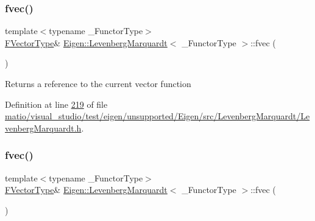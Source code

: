 \subsubsection{\texorpdfstring{fvec()}{fvec()}\hspace{0.1cm}{\footnotesize\ttfamily [1/2]}}
{\footnotesize\ttfamily template$<$typename \+\_\+\+Functor\+Type$>$ \\
\hyperlink{group___core___module}{F\+Vector\+Type}\& \hyperlink{class_eigen_1_1_levenberg_marquardt}{Eigen\+::\+Levenberg\+Marquardt}$<$ \+\_\+\+Functor\+Type $>$\+::fvec (\begin{DoxyParamCaption}{ }\end{DoxyParamCaption})\hspace{0.3cm}{\ttfamily [inline]}}

\begin{DoxyReturn}{Returns}
a reference to the current vector function 
\end{DoxyReturn}


Definition at line \hyperlink{matio_2visual__studio_2test_2eigen_2unsupported_2_eigen_2src_2_levenberg_marquardt_2_levenberg_marquardt_8h_source_l00219}{219} of file \hyperlink{matio_2visual__studio_2test_2eigen_2unsupported_2_eigen_2src_2_levenberg_marquardt_2_levenberg_marquardt_8h_source}{matio/visual\+\_\+studio/test/eigen/unsupported/\+Eigen/src/\+Levenberg\+Marquardt/\+Levenberg\+Marquardt.\+h}.

\mbox{\label{class_eigen_1_1_levenberg_marquardt_a6c296a4a5b91f0ecc398b479a67c242d}} 
\subsubsection{\texorpdfstring{fvec()}{fvec()}\hspace{0.1cm}{\footnotesize\ttfamily [2/2]}}
{\footnotesize\ttfamily template$<$typename \+\_\+\+Functor\+Type$>$ \\
\hyperlink{group___core___module}{F\+Vector\+Type}\& \hyperlink{class_eigen_1_1_levenberg_marquardt}{Eigen\+::\+Levenberg\+Marquardt}$<$ \+\_\+\+Functor\+Type $>$\+::fvec (\begin{DoxyParamCaption}{ }\end{DoxyParamCaption})\hspace{0.3cm}{\ttfamily [inline]}}

